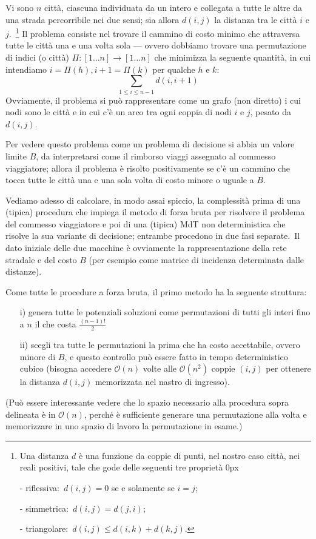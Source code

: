 \begin{example} 
    Vi sono $n$ città, ciascuna individuata da un intero e collegata a tutte le altre da una strada percorribile nei due sensi; sia allora $d(i, j)$ la distanza tra le città $i$ e $j$.\
    \footnote{Una distanza $d$ è una funzione da coppie di punti, nel nostro caso città, nei reali positivi, tale che gode delle seguenti tre proprietà
        \itemsep0px
        \item[-]  riflessiva:\ $d(i, j) = 0$ se e solamente se $i = j$;
        \item[-]  simmetrica:\ $d(i, j) = d(j, i)$;
        \item[-]  triangolare:\ $d(i, j) \leq d(i, k) + d(k, j)$.
    }
    Il problema consiste nel trovare il cammino di costo minimo che attraversa tutte le città una e una volta sola --- ovvero dobbiamo trovare una permutazione di indici (o città) $\Pi : [1\dots n] \rightarrow [1\dots n]$ che minimizza la seguente quantità, in cui intendiamo $i = \Pi(h), i + 1 = \Pi(k)$ per qualche $h$ e $k$:
    \[\sum_{1 \leq i \leq n-1} d(i,i+1)\]
    Ovviamente, il problema si può rappresentare come un grafo (non diretto) i cui nodi sono le città e in cui c'è un arco tra ogni coppia di nodi $i$ e $j$, pesato da $d(i,j)$.\

    Per vedere questo problema come un problema di decisione si abbia un valore limite $B$, da interpretarsi come il rimborso viaggi assegnato al commesso viaggiatore; allora il problema è risolto positivamente se c'è un cammino che tocca tutte le città una e una sola volta di costo minore o uguale a $B$.\

    \medskip
    \noindent Vediamo adesso di calcolare, in modo assai spiccio, la complessità prima di una (tipica) procedura che impiega il metodo di forza bruta per risolvere il problema del commesso viaggiatore e poi di una (tipica) MdT non deterministica che risolve la sua variante di decisione; entrambe procedono in due fasi separate.\
    Il dato iniziale delle due macchine è ovviamente la rappresentazione della rete stradale e del costo $B$ (per esempio come matrice di incidenza determinata dalle distanze).

    Come tutte le procedure a forza bruta, il primo metodo ha la seguente struttura:
    \begin{itemize}
        \item[i)] genera tutte le potenziali soluzioni come permutazioni di tutti gli interi fino a $n$ il che costa $\frac{(n-1)!}{2}$
        \item[ii)] scegli tra tutte le permutazioni la prima che ha costo accettabile, ovvero minore di $B$, e questo controllo può essere fatto in tempo deterministico cubico (bisogna accedere $\mathcal{O}(n)$ volte alle $\mathcal{O}(n^2)$ coppie $(i,j)$ per ottenere la distanza $d(i,j)$ memorizzata nel nastro di ingresso).
    \end{itemize}
    (Può essere interessante vedere che lo spazio necessario alla procedura sopra delineata è in $\mathcal{O}(n)$, perché è sufficiente generare una permutazione alla volta e memorizzare in uno spazio di lavoro la permutazione in esame.)


\end{example}
